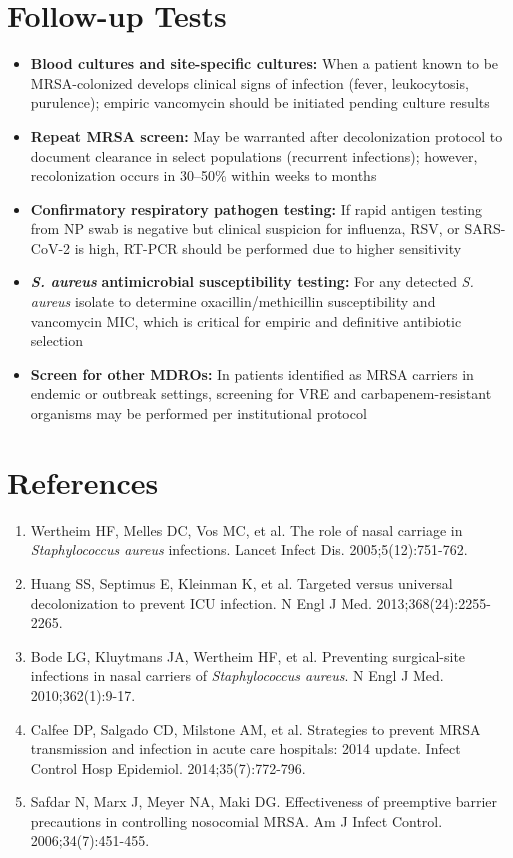 \section*{Follow-up Tests}
\begin{itemize}
  \item \textbf{Blood cultures and site-specific cultures:} When a patient known to be MRSA-colonized develops clinical signs of infection (fever, leukocytosis, purulence); empiric vancomycin should be initiated pending culture results
  \item \textbf{Repeat MRSA screen:} May be warranted after decolonization protocol to document clearance in select populations (recurrent infections); however, recolonization occurs in 30--50\% within weeks to months
  \item \textbf{Confirmatory respiratory pathogen testing:} If rapid antigen testing from NP swab is negative but clinical suspicion for influenza, RSV, or SARS-CoV-2 is high, RT-PCR should be performed due to higher sensitivity
  \item \textit{\textbf{S. aureus}} \textbf{antimicrobial susceptibility testing:} For any detected \textit{S. aureus} isolate to determine oxacillin/methicillin susceptibility and vancomycin MIC, which is critical for empiric and definitive antibiotic selection
  \item \textbf{Screen for other MDROs:} In patients identified as MRSA carriers in endemic or outbreak settings, screening for VRE and carbapenem-resistant organisms may be performed per institutional protocol
\end{itemize}

\section*{References}
\begin{enumerate}
  \item Wertheim HF, Melles DC, Vos MC, et al. The role of nasal carriage in \textit{Staphylococcus aureus} infections. Lancet Infect Dis. 2005;5(12):751-762.
  \item Huang SS, Septimus E, Kleinman K, et al. Targeted versus universal decolonization to prevent ICU infection. N Engl J Med. 2013;368(24):2255-2265.
  \item Bode LG, Kluytmans JA, Wertheim HF, et al. Preventing surgical-site infections in nasal carriers of \textit{Staphylococcus aureus}. N Engl J Med. 2010;362(1):9-17.
  \item Calfee DP, Salgado CD, Milstone AM, et al. Strategies to prevent MRSA transmission and infection in acute care hospitals: 2014 update. Infect Control Hosp Epidemiol. 2014;35(7):772-796.
  \item Safdar N, Marx J, Meyer NA, Maki DG. Effectiveness of preemptive barrier precautions in controlling nosocomial MRSA. Am J Infect Control. 2006;34(7):451-455.
\end{enumerate}

\clearpage
